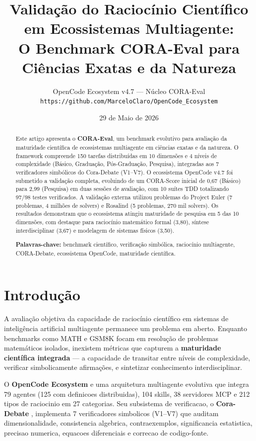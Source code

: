\documentclass[12pt,a4paper]{article}
\title{\textbf{Validação do Raciocínio Científico em Ecossistemas Multiagente:}\\
       \large O Benchmark CORA-Eval para Ciências Exatas e da Natureza}
\author{OpenCode Ecosystem v4.7 — Núcleo CORA-Eval\\
        \texttt{https://github.com/MarceloClaro/OpenCode\_Ecosystem}}
\date{29 de Maio de 2026}
\begin{document}
\maketitle

\begin{abstract}
Este artigo apresenta o \textbf{CORA-Eval}, um benchmark evolutivo para avaliação
da maturidade científica de ecossistemas multiagente em ciências exatas e da natureza.
O framework compreende 150 tarefas distribuídas em 10 dimensões e 4 níveis de
complexidade (Básico, Graduação, Pós-Graduação, Pesquisa), integradas aos 7
verificadores simbólicos do Cora-Debate (V1--V7). O ecossistema OpenCode v4.7
foi submetido a validação completa, evoluindo de um CORA-Score inicial de 0,67
(Básico) para 2,99 (Pesquisa) em duas sessões de avaliação, com 10 suítes TDD
totalizando 97/98 testes verificados. A validação externa utilizou problemas do
Project Euler (7 problemas, 4 milhões de solvers) e Rosalind (5 problemas, 270 mil
solvers). Os resultados demonstram que o ecossistema atingiu maturidade de
pesquisa em 5 das 10 dimensões, com destaque para raciocínio matemático formal
(3,80), síntese interdisciplinar (3,67) e modelagem de sistemas físicos (3,50).

\textbf{Palavras-chave:} benchmark científico, verificação simbólica, raciocínio
multiagente, CORA-Debate, ecossistema OpenCode, maturidade científica.
\end{abstract}

\section{Introdução}

A avaliação objetiva da capacidade de raciocínio científico em sistemas de
inteligência artificial multiagente permanece um problema em aberto. Enquanto
benchmarks como MATH \cite{hendrycks2021math} e GSM8K \cite{cobbe2021gsm8k}
focam em resolução de problemas matemáticos isolados, inexistem métricas que
capturem a \textbf{maturidade científica integrada} — a capacidade de transitar
entre níveis de complexidade, verificar simbolicamente afirmações, e sintetizar
conhecimento interdisciplinar.

O \textbf{OpenCode Ecosystem} \cite{opencode2026} e uma arquitetura multiagente
evolutiva que integra 79 agentes (125 com definicoes distribuidas), 104 skills, 38 servidores MCP e 212 tipos de
raciocinio em 27 categorias. Seu subsistema de verificacao, o \textbf{Cora-Debate}
\cite{faradinelli2021gat}, implementa 7 verificadores simbolicos (V1--V7) que
auditam dimensionalidade, consistencia algebrica, contraexemplos, significancia
estatistica, precisao numerica, equacoes diferenciais e correcao de codigo-fonte.
\end{document}

